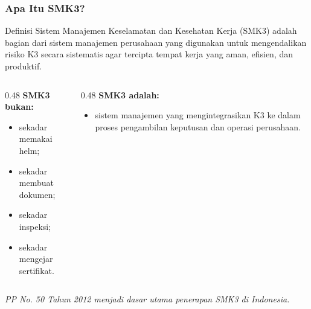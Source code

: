\documentclass[../main.tex]{subfiles}
\begin{document}
\begin{frame}[mytitle=center,c,mycolor=digiPH_leaf!10]
	\frametitle{Apa Itu SMK3?}

	\begin{block}{Definisi}
		Sistem Manajemen Keselamatan dan Kesehatan Kerja (SMK3) adalah bagian dari sistem manajemen perusahaan yang digunakan untuk mengendalikan risiko K3 secara sistematis agar tercipta tempat kerja yang aman, efisien, dan produktif.
	\end{block}

	\begin{columns}[t]
		\begin{column}{0.48\textwidth}
			\textbf{SMK3 bukan:}
			\begin{itemize}
				\item sekadar memakai helm;
				\item sekadar membuat dokumen;
				\item sekadar inspeksi;
				\item sekadar mengejar sertifikat.
			\end{itemize}
		\end{column}

		\begin{column}{0.48\textwidth}
			\textbf{SMK3 adalah:}
			\begin{itemize}
				\item sistem manajemen yang mengintegrasikan K3 ke dalam proses pengambilan keputusan dan operasi perusahaan.
			\end{itemize}
		\end{column}
	\end{columns}

	\vspace{0.5cm}
	\textit{PP No. 50 Tahun 2012 menjadi dasar utama penerapan SMK3 di Indonesia.}
\end{frame}
\end{document}
